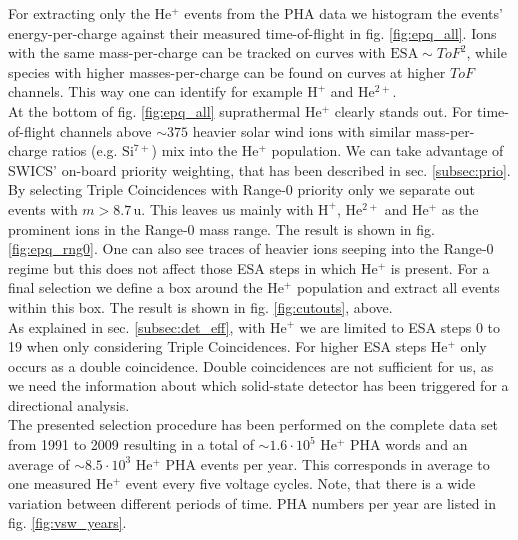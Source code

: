 For extracting only the $\mathrm{He^{+}}$ events from the PHA data we histogram the events' energy-per-charge against their measured time-of-flight in fig. \ref{fig:epq_all}. 
Ions with the same mass-per-charge can be tracked on curves with $\mathrm{ESA} \sim ToF^2$, while species with higher masses-per-charge can be found on curves at higher $ToF$ channels. This way one can identify for example $\mathrm{H^{+}}$ and $\mathrm{He^{2+}}$. \\
At the bottom of fig. \ref{fig:epq_all} suprathermal $\mathrm{He^{+}}$ clearly stands out. For time-of-flight channels above $\sim 375$ heavier solar wind ions with similar mass-per-charge ratios (e.g. $\mathrm{Si^{7+}}$) mix into the $\mathrm{He^{+}}$ population.
We can take advantage of SWICS' on-board priority weighting, that has been described in sec. \ref{subsec:prio}. By selecting Triple Coincidences with Range-0 priority only we separate out events with $m>8.7\,\mathrm{u}$. This leaves us mainly with $\mathrm{H^+}$, $\mathrm{He^{2+}}$ and $\mathrm{He^{+}}$ as the prominent ions in the Range-0 mass range. The result is shown in fig. \ref{fig:epq_rng0}. One can also see traces of heavier ions seeping into the Range-0 regime but this does not affect those ESA steps in which $\mathrm{He^{+}}$ is present.
For a final selection we define a box around the $\mathrm{He^{+}}$ population and extract all events within this box. The result is shown in fig. \ref{fig:cutouts}, above.
\\
As explained in sec. \ref{subsec:det_eff}, with $\mathrm{He^{+}}$ we are limited to ESA steps 0 to 19 when only considering Triple Coincidences. For higher ESA steps $\mathrm{He^{+}}$ only occurs as a double coincidence. Double coincidences are not sufficient for us, as we need the information about which solid-state detector has been triggered for a directional analysis.
\\
The presented selection procedure has been performed on the complete data set from 1991 to 2009 resulting in a total of $\sim 1.6\cdot10^{5}$ $\mathrm{He^{+}}$ PHA words and an average of $\sim 8.5\cdot10^{3}$ $\mathrm{He^{+}}$ PHA events per year. This corresponds in average to one measured $\mathrm{He^{+}}$ event every five voltage cycles. Note, that there is a wide variation between different periods of time. PHA numbers per year are listed in fig. \ref{fig:vsw_years}.
%
%
%
